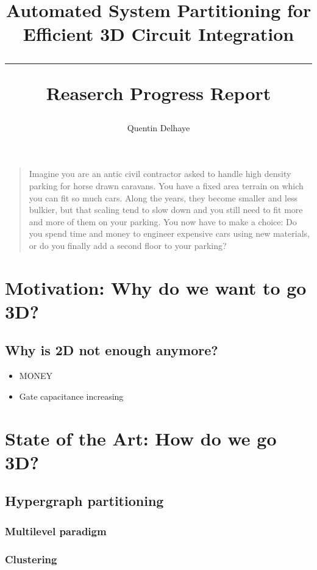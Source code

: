 \documentclass[12pt,a4paper]{article}
\author{Quentin Delhaye}
\title{Automated System Partitioning for Efficient 3D Circuit Integration \\ \vspace{.5em} \hrule \vspace{.5em} \large Reaserch Progress Report}
\theoremstyle{customdef}
\begin{document}
\maketitle
\tableofcontents

\clearpage

\begin{quote}
Imagine you are an antic civil contractor asked to handle high density parking for horse drawn caravans.
You have a fixed area terrain on which you can fit so much cars.
Along the years, they become smaller and less bulkier, but that scaling tend to slow down and you still need to fit more and more of them on your parking.
You now have to make a choice: Do you spend time and money to engineer expensive cars using new materials, or do you finally add a second floor to your parking?
\end{quote}

\section{Motivation: Why do we want to go 3D?}
\subsection{Why is 2D not enough anymore?}
\begin{itemize}
	\item MONEY
	\item Gate capacitance increasing
\end{itemize}


\section{State of the Art: How do we go 3D?}
\subsection{Hypergraph partitioning}
\subsubsection{Multilevel paradigm}
\subsubsection{Clustering}
\end{document}
